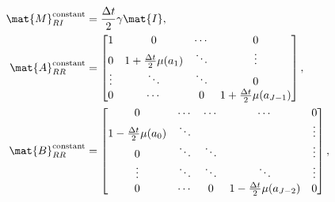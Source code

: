 \documentclass{jpmarticle}
\begin{document}
\begin{equation}
  \begin{split}
    \mat{M}_{RI}^{\text{constant}} &=
    \frac{\Delta t}{2} \gamma \mat{I},
    \\
    \mat{A}_{RR}^{\text{constant}} &=
    \begin{bmatrix}
      1 & 0 & \cdots & 0
      \\
      0 & 1 + \frac{\Delta t}{2} \mu(a_1) &
      \ddots & \vdots
      \\
      \vdots & \ddots & \ddots & 0
      \\
      0 & \cdots & 0 &
      1 + \frac{\Delta t}{2} \mu(a_{J - 1})
    \end{bmatrix},
    \\
    \mat{B}_{RR}^{\text{constant}} &=
    \begin{bmatrix}
      0 & \cdots & \cdots & \cdots & 0
      \\
      1 - \frac{\Delta t}{2} \mu(a_0) & \ddots &
      & & \vdots
      \\
      0 & \ddots & \ddots & & \vdots
      \\
      \vdots & \ddots & \ddots & \ddots & \vdots
      \\
      0 & \cdots & 0 &
      1 - \frac{\Delta t}{2} \mu(a_{J - 2}) & 0
    \end{bmatrix},
  \end{split}
\end{equation}
\end{document}
